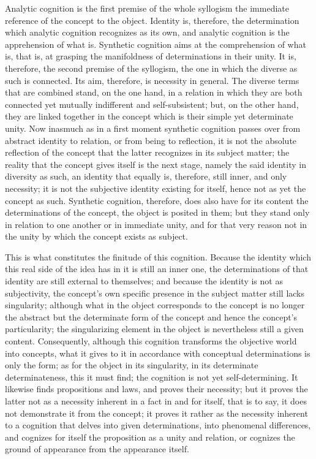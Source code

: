 Analytic cognition is the first premise of the whole syllogism
the immediate reference of the concept to the object.
Identity is, therefore, the determination
which analytic cognition recognizes as its own,
and analytic cognition is the apprehension of what is.
Synthetic cognition aims at the comprehension of what is,
that is, at grasping the manifoldness of
determinations in their unity.
It is, therefore, the second premise of the syllogism,
the one in which the diverse as such is connected.
Its aim, therefore, is necessity in general.
The diverse terms that are combined stand,
on the one hand, in a relation in which
they are both connected yet mutually
indifferent and self-subsistent;
but, on the other hand, they are linked together
in the concept which is their simple yet determinate unity.
Now inasmuch as in a first moment
synthetic cognition passes over
from abstract identity to relation,
or from being to reflection,
it is not the absolute reflection
of the concept that the latter
recognizes in its subject matter;
the reality that the concept
gives itself is the next stage,
namely the said identity in diversity as such,
an identity that equally is, therefore,
still inner, and only necessity;
it is not the subjective identity existing for itself,
hence not as yet the concept as such.
Synthetic cognition, therefore, does also have
for its content the determinations of the concept,
the object is posited in them;
but they stand only in relation to one another
or in immediate unity,
and for that very reason not in the unity
by which the concept exists as subject.

This is what constitutes the finitude of this cognition.
Because the identity which this real side of
the idea has in it is still an inner one,
the determinations of that identity are
still external to themselves;
and because the identity is not as subjectivity,
the concept's own specific presence in
the subject matter still lacks singularity;
although what in the object corresponds to
the concept is no longer the abstract
but the determinate form of the concept
and hence the concept's particularity;
the singularizing element in the object is
nevertheless still a given content.
Consequently, although this cognition
transforms the objective world into concepts,
what it gives to it in accordance
with conceptual determinations is only the form;
as for the object in its singularity,
in its determinate determinateness,
this it must find;
the cognition is not yet self-determining.
It likewise finds propositions and laws,
and proves their necessity;
but it proves the latter not as a necessity
inherent in a fact in and for itself,
that is to say, it does not
demonstrate it from the concept;
it proves it rather as the necessity
inherent to a cognition
that delves into given determinations,
into phenomenal differences,
and cognizes for itself the proposition as
a unity and relation,
or cognizes the ground of appearance
from the appearance itself.


